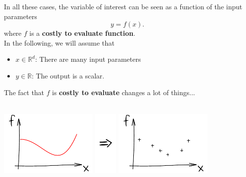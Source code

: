\begin{frame}{}
In all these cases, the variable of interest can be seen as a function of the input parameters
$$ y = f(x). $$
where $f$ is a \textbf{costly to evaluate function}. \\
\vspace{5mm}
In the following, we will assume that
\begin{itemize}
	\item $x \in \mathds{R}^d$: There are many input parameters
	\item $y \in \mathds{R}$: The output is a scalar.
\end{itemize}
\end{frame}

\begin{frame}{}
The fact that $f$ is \textbf{costly to evaluate} changes a lot of things...\\
\vspace{5mm}
\\
\vspace{5mm}
\begin{center}
\includegraphics[height=3.2cm]{1_stat_models/figures/ink_f} \includegraphics[height=3.2cm]{1_stat_models/figures/Rightarrow} \includegraphics[height=3.2cm]{1_stat_models/figures/ink_fX}
\end{center}
\end{frame}

